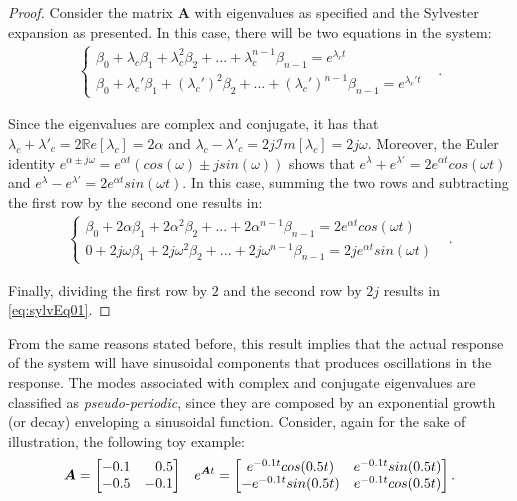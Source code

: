 \documentclass[a4paper,11pt]{book}
\numberwithin{figure}{chapter}
\numberwithin{equation}{chapter}
\numberwithin{table}{chapter}
\theoremstyle{definition}
\begin{document}
\begin{proof}
    Consider the matrix $\bm{A}$ with eigenvalues as specified and the Sylvester expansion as presented. In this case, there will be two equations in the system:
    \begin{align} 
    \begin{cases}
        \beta_0 + \lambda_c \beta_1 + \lambda_c^2  \beta_2 + ... + \lambda_c^{n-1} \beta_{n-1} = e^{\lambda_c t} & \\
        \beta_0 + \lambda_c' \beta_1 + (\lambda_c')^{2} \beta_2 + ... + (\lambda_c')^{n-1} \beta_{n-1} = e^{\lambda_c' t} &
    \end{cases}
    .\end{align}
    
    Since the eigenvalues are complex and conjugate, it has that $\lambda_c + \lambda'_c = 2 \mathbb{R}e[\lambda_c] = 2 \alpha$ and $\lambda_c - \lambda'_c = 2j \mathcal{I}m[\lambda_c] = 2j \omega$. Moreover, the Euler identity $e^{\alpha \pm j \omega} = e^{\alpha t}(cos(\omega) \pm j sin(\omega))$ shows that $e^{\lambda} + e^{\lambda'} = 2 e^{\alpha t} cos(\omega t)$ and $e^{\lambda} - e^{\lambda'} = 2 e^{\alpha t} sin(\omega t)$. In this case, summing the two rows and subtracting the first row by the second one results in:
    \begin{align} 
    \begin{cases}
        \beta_0 + 2 \alpha \beta_1 + 2 \alpha^2  \beta_2 + ... + 2 \alpha^{n-1} \beta_{n-1} = 2 e^{\alpha t} cos(\omega t) & \\
        0 + 2j \omega \beta_1 + 2j \omega^{2} \beta_2 + ... + 2j \omega^{n-1} \beta_{n-1} = 2j e^{\alpha t} sin(\omega t) &
    \end{cases}
    .\end{align}
    
    Finally, dividing the first row by $2$ and the second row by $2j$ results in \eqref{eq:sylvEq01}.
\end{proof}

From the same reasons stated before, this result implies that the actual response of the system will have sinusoidal components that produces oscillations in the response. The modes associated with complex and conjugate eigenvalues are classified as \textit{pseudo-periodic}, since they are composed by an exponential growth (or decay) enveloping a sinusoidal function. Consider, again for the sake of illustration, the following toy example:
\begin{align} \label{eq:stateRespEx02}
    \bm{A} = \begin{bmatrix} 
         -0.1  &  \hfill 0.5 \\
        -0.5   &  -0.1 
    \end{bmatrix} && e^{\bm{A} t} = \begin{bmatrix} 
        e^{-0.1 t} cos(0.5t)  &    e^{-0.1 t} sin(0.5t) \\
        -e^{-0.1 t} sin(0.5t)  &  e^{-0.1 t} cos(0.5t)
    \end{bmatrix}
.\end{align}
\end{document}
